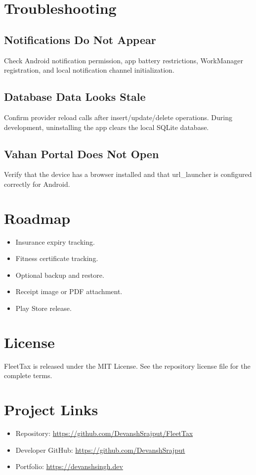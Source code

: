 \documentclass[11pt,a4paper]{article}
\begin{document}
\section{Troubleshooting}

\subsection{Notifications Do Not Appear}
Check Android notification permission, app battery restrictions, WorkManager registration, and local notification channel initialization.

\subsection{Database Data Looks Stale}
Confirm provider reload calls after insert/update/delete operations. During development, uninstalling the app clears the local SQLite database.

\subsection{Vahan Portal Does Not Open}
Verify that the device has a browser installed and that url\_launcher is configured correctly for Android.

\section{Roadmap}

\begin{itemize}[leftmargin=*]
  \item Insurance expiry tracking.
  \item Fitness certificate tracking.
  \item Optional backup and restore.
  \item Receipt image or PDF attachment.
  \item Play Store release.
\end{itemize}

\section{License}

FleetTax is released under the MIT License. See the repository license file for the complete terms.

\section{Project Links}

\begin{itemize}[leftmargin=*]
  \item Repository: \url{https://github.com/DevanshSrajput/FleetTax}
  \item Developer GitHub: \url{https://github.com/DevanshSrajput}
  \item Portfolio: \url{https://devanshsingh.dev}
\end{itemize}
\end{document}
